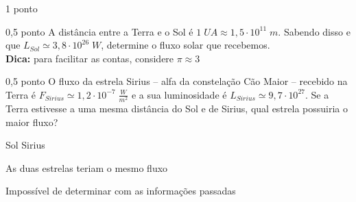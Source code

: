 \documentclass{../lista}
\begin{document}
\begin{questao}{1 ponto}
		\begin{pergunta}{0,5 ponto}
			A distância entre a Terra e o Sol é $1 \; UA \approx 1,5 \cdot 10^{11} \; m$. Sabendo disso e que $L_{Sol} \simeq 3,8 \cdot 10^{26} \; W$, determine o fluxo solar que recebemos. \\
			\textbf{Dica:} para facilitar as contas, considere $\pi \approx 3$


		\end{pergunta}

		\begin{pergunta}{0,5 ponto}
			O fluxo da estrela Sirius -- alfa da constelação Cão Maior -- recebido na Terra é $F_{Sirius} \simeq 1,2 \cdot 10^{-7} \; \frac{W}{m^2}$ e a sua luminosidade é $L_{Sirius} \simeq 9,7 \cdot 10^{27}$. Se a Terra estivesse a uma mesma distância do Sol e de Sirius, qual estrela possuiria o maior fluxo?


			\begin{alternativas}
				\item Sol
				\alternativaMarcada Sirius
				\item As duas estrelas teriam o mesmo fluxo
				\item Impossível de determinar com as informações passadas
			\end{alternativas}
		\end{pergunta}
	\end{questao}
\end{document}
